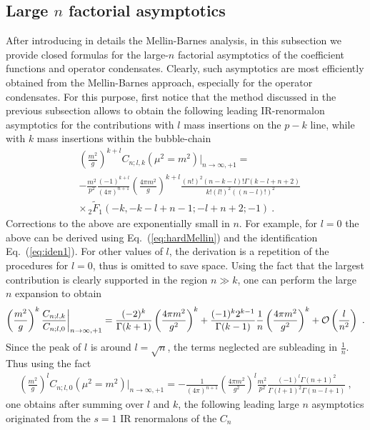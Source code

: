 \documentclass[a4paper,11pt]{article}
\begin{document}
\subsection{Large $n$ factorial asymptotics}
After introducing in details the Mellin-Barnes analysis, in this subsection we provide closed formulas for the large-$n$ factorial asymptotics of the coefficient functions and operator condensates. Clearly, such asymptotics are most efficiently obtained from the Mellin-Barnes approach, especially for the operator condensates.  For this purpose, first notice that the method discussed in the previous subsection allows to obtain the following leading IR-renormalon asymptotics for the contributions with $l$ mass insertions on the $p-k$ line, while with $k$ mass insertions within the bubble-chain
\begin{align}\label{eq:generalasym}
&\left(\frac{m^2}{g}\right)^{k+l}C_{n;l,k}(\mu^2=m^2)\bigg|_{n\rightarrow\infty,+1}=\nonumber \\ 
&-\frac{m^2}{p^2}\frac{(-1)^{k+l}}{(4\pi)^{n+1}}\left(\frac{4\pi m^2}{g}\right)^{k+l} \frac{(n!)^2  (n-k-l)! \Gamma (k-l+n+2)}{  k! (l!)^2 ((n-l)!)^2} \nonumber \\ &\times  \, _2\tilde{F}_1(-k,-k-l+n-1;-l+n+2;-1) \ .
\end{align}
Corrections to the above are exponentially small in $n$. For example, for $l=0$ the above can be derived using Eq.~(\ref{eq:hardMellin}) and the identification Eq.~(\ref{eq:iden1}). For other values of $l$, the derivation is a repetition of the procedures for $l=0$, thus is omitted to save space.  Using the fact that the largest contribution is clearly supported in the region $n\gg k$, one can perform the large $n$ expansion to obtain
\begin{align}
\left(\frac{m^2}{g}\right)^{k}\frac{C_{n;l,k}}{C_{n;l,0}}\bigg|_{n\rightarrow \infty, +1}=\frac{(-2)^k}{\Gamma (k+1)}\left(\frac{4\pi m^2}{g^2}\right)^k+\frac{(-1)^k 2^{k-1}}{ \Gamma (k-1)}\frac{1}{n}\left(\frac{4\pi m^2}{g^2}\right)^k+{\cal O}\left(\frac{l}{n^2}\right) \ .
\end{align}
Since the peak of $l$ is around $l=\sqrt{n}$, the terms neglected are subleading in $\frac{1}{n}$. Thus using the fact
\begin{align}
\left(\frac{m^2}{g}\right)^{l}C_{n;l,0}(\mu^2=m^2)\bigg|_{n\rightarrow \infty,+1}=-\frac{1}{(4\pi)^{n+1}}\left(\frac{4\pi m^2}{g^2}\right)^l\frac{m^2}{p^2}\frac{(-1)^{l} \Gamma (n+1)^2}{\Gamma (l+1)^2 \Gamma (n-l+1)} \ ,
\end{align}
one obtains after summing over $l$ and $k$, the following leading large $n$ asymptotics originated from the $s=1$ IR renormalons of the $C_n$ 
\end{document}
